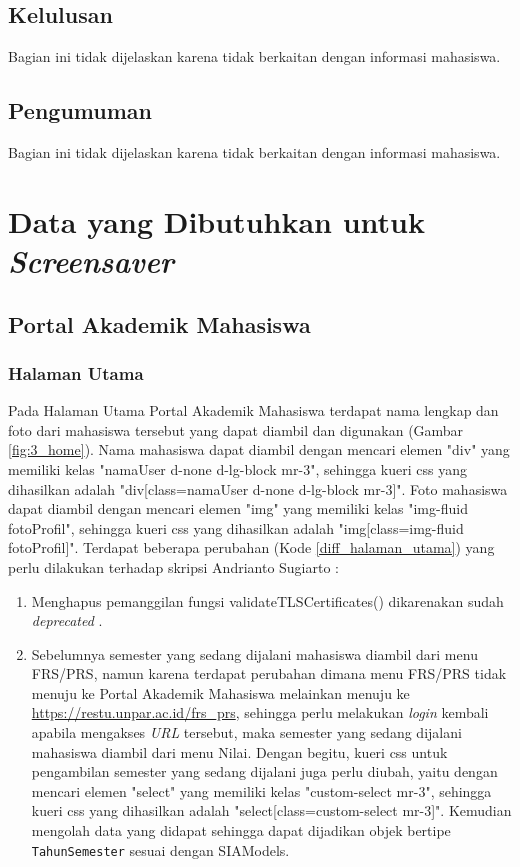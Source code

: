 \subsection{Kelulusan}

Bagian ini tidak dijelaskan karena tidak berkaitan dengan informasi mahasiswa.

\subsection{Pengumuman}

Bagian ini tidak dijelaskan karena tidak berkaitan dengan informasi mahasiswa.

\section{Data yang Dibutuhkan untuk \textit{Screensaver}}

\subsection{Portal Akademik Mahasiswa}

\subsubsection{Halaman Utama}
Pada Halaman Utama Portal Akademik Mahasiswa terdapat nama lengkap dan foto dari mahasiswa tersebut yang dapat diambil dan digunakan (Gambar \ref{fig:3_home}). Nama mahasiswa dapat diambil dengan mencari elemen "div" yang memiliki kelas "namaUser d-none d-lg-block mr-3", sehingga kueri css yang dihasilkan adalah "div[class=namaUser d-none d-lg-block mr-3]". Foto mahasiswa dapat diambil dengan mencari elemen "img" yang memiliki kelas "img-fluid fotoProfil", sehingga kueri css yang dihasilkan adalah "img[class=img-fluid fotoProfil]".
Terdapat beberapa perubahan (Kode \ref{diff_halaman_utama}) yang perlu dilakukan terhadap skripsi Andrianto Sugiarto \cite{ifstupor}: 

\begin{enumerate}
    \item Menghapus pemanggilan fungsi validateTLSCertificates() dikarenakan sudah \textit{deprecated} \cite{jsoup}.
    \item Sebelumnya semester yang sedang dijalani mahasiswa diambil dari menu FRS/PRS, namun karena terdapat perubahan dimana menu FRS/PRS tidak menuju ke Portal Akademik Mahasiswa melainkan menuju ke \url{https://restu.unpar.ac.id/frs_prs}, sehingga perlu melakukan \textit{login} kembali apabila mengakses \textit{URL} tersebut, maka semester yang sedang dijalani mahasiswa diambil dari menu Nilai. Dengan begitu, kueri css untuk pengambilan semester yang sedang dijalani juga perlu diubah, yaitu dengan mencari elemen "select" yang memiliki kelas "custom-select mr-3", sehingga kueri css yang dihasilkan adalah "select[class=custom-select mr-3]". Kemudian mengolah data yang didapat sehingga dapat dijadikan objek bertipe \texttt{TahunSemester} sesuai dengan SIAModels.
\end{enumerate}

